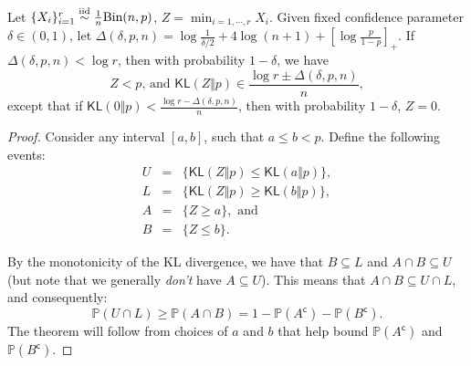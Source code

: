 \documentclass[12pt]{article}
\newcommand{\KL}{\textsf{KL}}
\newcommand{\comp}{\mathsf{c}}
\begin{document}
\begin{theorem}\label{thm1}
    Let $\{X_i\}_{i = 1}^r \overset{\mathrm{iid}}{\sim} \frac{1}{n}\textnormal{Bin}(n, p)$, $Z = \min_{i = 1, \cdots, r} X_i$. Given fixed confidence parameter $\delta \in (0,1)$, let $\Delta(\delta, p, n) = \log \frac{1}{\delta/2} + 4\log (n+1) + \left[ \log \frac{p}{1-p} \right]_+ $. If $\Delta(\delta, p, n) < \log r$, then with probability $1-\delta$, we have
    \[
    Z < p \text{, and } \KL(Z\Vert p) \in \frac{\log r \pm \Delta(\delta, p, n)}{n},
    \]
    except that if $\KL(0 \Vert p) < \frac{\log r -\Delta(\delta, p, n)}{n}$, then with probability $1-\delta$, $Z = 0$.
\end{theorem}

\begin{proof}
    Consider any interval $[a,b]$, such that $a\leq b< p$. Define the following events:
    \begin{eqnarray*}
        U &=& \{ \KL(Z\Vert p) \leq \KL(a\Vert p) \}, \\
        L &=& \{ \KL(Z\Vert p) \geq \KL(b\Vert p) \}, \\
        A &=& \{ Z \geq a \},\textrm{ and} \\
        B &=& \{ Z \leq b \}.
    \end{eqnarray*}
    \begin{center}
    \end{center}
    By the monotonicity of the KL divergence, we have that $B \subseteq L$ and $A \cap B \subseteq U$ (but note that we generally \emph{don't} have $A \subseteq U$). This means that $A \cap B \subseteq U \cap L$, and consequently:
    \[
        \mathbb{P}(U \cap L) \geq  \mathbb{P}(A \cap B)  = 1 - \mathbb{P}(A^\comp) - \mathbb{P}(B^\comp).
    \]
    The theorem will follow from choices of $a$ and $b$ that help bound $\mathbb{P}(A^\comp)$ and $\mathbb{P}(B^\comp)$.
    

\end{proof}
\end{document}
